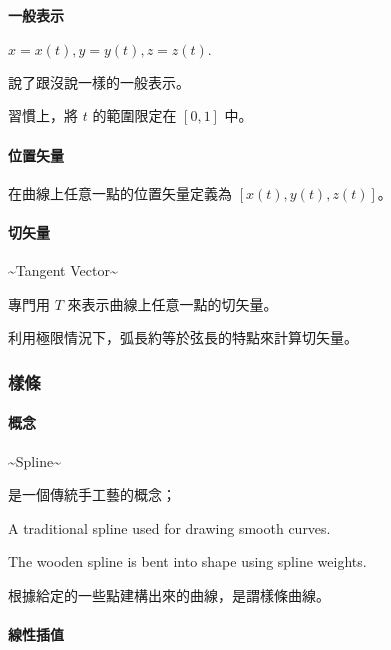 \documentclass[
]{article}
\begin{document}
\hypertarget{header-n153}{%
\paragraph{一般表示}\label{header-n153}}

\(x = x(t), y = y(t), z = z(t).\)

說了跟沒說一樣的一般表示。

習慣上，將 \(t\) 的範圍限定在 \([0, 1]\) 中。

\hypertarget{header-n157}{%
\paragraph{位置矢量}\label{header-n157}}

在曲線上任意一點的位置矢量定義為 \([x(t), y(t), z(t)]\)。

\hypertarget{header-n159}{%
\paragraph{切矢量}\label{header-n159}}

\textasciitilde Tangent Vector\textasciitilde{}

專門用 \(T\) 來表示曲線上任意一點的切矢量。

利用極限情況下，弧長約等於弦長的特點來計算切矢量。

\hypertarget{header-n163}{%
\subsubsection{樣條}\label{header-n163}}

\hypertarget{header-n164}{%
\paragraph{概念}\label{header-n164}}

\textasciitilde{}Spline\textasciitilde{}

是一個傳統手工藝的概念；

A traditional spline used for drawing smooth curves.

The wooden spline is bent into shape using spline weights.

根據給定的一些點建構出來的曲線，是謂樣條曲線。

\hypertarget{header-n170}{%
\paragraph{線性插值}\label{header-n170}}
\end{document}
